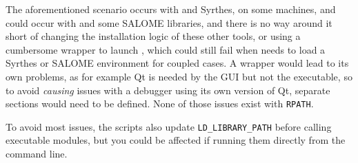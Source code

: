\documentclass[a4paper,10pt,twoside]{csshortdoc}
\begin{document}
The aforementioned scenario occurs with \CS and Syrthes, on some
machines, and could occur with \CS and some SALOME libraries, and there is
no way around it short of changing the installation logic of these other tools,
or using a cumbersome wrapper to launch \CS, which could still fail when
\CS needs to load a Syrthes or SALOME environment for coupled cases.
A wrapper would lead to its own problems, as for example Qt is needed
by the GUI but not the executable, so to avoid \emph{causing} issues with
a debugger using its own version of Qt, separate sections would need
to be defined. None of those issues exist with \texttt{RPATH}.

To avoid most issues, the \CS scripts also update \texttt{LD\_LIBRARY\_PATH}
before calling executable modules, but you could be affected if running
them directly from the command line.
\end{document}
